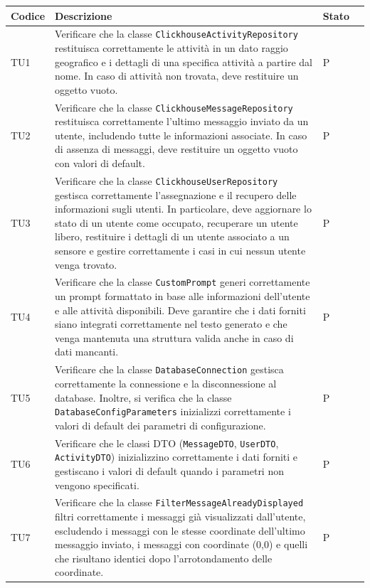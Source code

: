 \documentclass[10pt]{article}
\begin{document}
\begin{justify}
\begin{longtable}{|>{\centering\arraybackslash}m{2cm}|>{\centering\arraybackslash}m{7cm}|>{\centering\arraybackslash}m{2cm}|>{\centering\arraybackslash}m{2cm}|}
\hline
\textbf{Codice} & \textbf{Descrizione} & \textbf{Stato}\\
\endhead
\hline
TU1 & Verificare che la classe \texttt{ClickhouseActivityRepository} restituisca correttamente le attività in un dato raggio geografico e i dettagli di una specifica attività a partire dal nome. In caso di attività non trovata, deve restituire un oggetto vuoto. & P \\
\hline
TU2 & Verificare che la classe \texttt{ClickhouseMessageRepository} restituisca correttamente l'ultimo messaggio inviato da un utente, includendo tutte le informazioni associate. In caso di assenza di messaggi, deve restituire un oggetto vuoto con valori di default. & P \\
\hline
TU3 & Verificare che la classe \texttt{ClickhouseUserRepository} gestisca correttamente l'assegnazione e il recupero delle informazioni sugli utenti. In particolare, deve aggiornare lo stato di un utente come occupato, recuperare un utente libero, restituire i dettagli di un utente associato a un sensore e gestire correttamente i casi in cui nessun utente venga trovato. & P \\
\hline
TU4 & Verificare che la classe \texttt{CustomPrompt} generi correttamente un prompt formattato in base alle informazioni dell'utente e alle attività disponibili. Deve garantire che i dati forniti siano integrati correttamente nel testo generato e che venga mantenuta una struttura valida anche in caso di dati mancanti. & P \\
\hline
TU5 & Verificare che la classe \texttt{DatabaseConnection} gestisca correttamente la connessione e la disconnessione al database. Inoltre, si verifica che la classe \texttt{DatabaseConfigParameters} inizializzi correttamente i valori di default dei parametri di configurazione. & P \\
\hline
TU6 & Verificare che le classi DTO (\texttt{MessageDTO}, \texttt{UserDTO}, \texttt{ActivityDTO}) inizializzino correttamente i dati forniti e gestiscano i valori di default quando i parametri non vengono specificati. & P \\
\hline
TU7 & Verificare che la classe \texttt{FilterMessageAlreadyDisplayed} filtri correttamente i messaggi già visualizzati dall'utente, escludendo i messaggi con le stesse coordinate dell'ultimo messaggio inviato, i messaggi con coordinate (0,0) e quelli che risultano identici dopo l'arrotondamento delle coordinate. & P \\

\end{longtable}
\end{justify}
\end{document}
